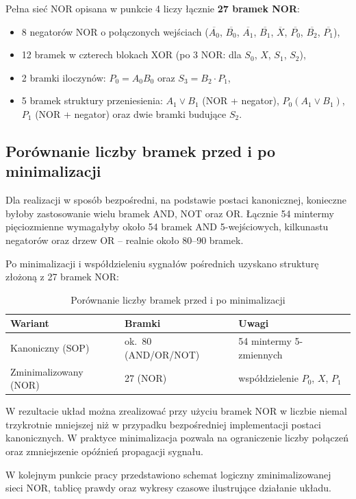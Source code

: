 \documentclass[11pt]{article}
\begin{document}
Pełna sieć NOR opisana w punkcie 4 liczy łącznie \textbf{27 bramek NOR}:
\begin{itemize}
    \item 8 negatorów NOR o połączonych wejściach (\(\overline{A_0}\), \(\overline{B_0}\), \(\overline{A_1}\), \(\overline{B_1}\), \(\overline{X}\), \(\overline{P_0}\), \(\overline{B_2}\), \(\overline{P_1}\)),
    \item 12 bramek w czterech blokach XOR (po 3 NOR: dla \(S_0\), \(X\), \(S_1\), \(S_2\)),
    \item 2 bramki iloczynów: \(P_0 = A_0 B_0\) oraz \(S_3 = B_2 \cdot P_1\),
    \item 5 bramek struktury przeniesienia: \(A_1 \lor B_1\) (NOR + negator), \(P_0(A_1 \lor B_1)\), \(P_1\) (NOR + negator) oraz dwie bramki budujące \(S_2\).
\end{itemize}

\subsection{Porównanie liczby bramek przed i po minimalizacji}

Dla realizacji w sposób bezpośredni, na podstawie postaci kanonicznej, konieczne byłoby zastosowanie wielu bramek AND, NOT oraz OR. Łącznie 54 mintermy pięciozmienne wymagałyby około 54 bramek AND 5-wejściowych, kilkunastu negatorów oraz drzew OR -- realnie około 80--90 bramek.

Po minimalizacji i współdzieleniu sygnałów pośrednich uzyskano strukturę złożoną z 27 bramek NOR:
\begin{table}[H]
\centering
\caption{Porównanie liczby bramek przed i po minimalizacji}
\setlength{\tabcolsep}{5pt}
\begin{tabular}{lll}
\toprule
Wariant & Bramki & Uwagi \\
\midrule
Kanoniczny (SOP) & ok.~80 (AND/OR/NOT) & 54 mintermy 5-zmiennych \\
Zminimalizowany (NOR) & 27 (NOR) & wspó\l{}dzielenie \(P_0\), \(X\), \(P_1\) \\
\bottomrule
\end{tabular}
\end{table}

W rezultacie układ można zrealizować przy użyciu bramek NOR w liczbie niemal trzykrotnie mniejszej niż w przypadku bezpośredniej implementacji postaci kanonicznych. W praktyce minimalizacja pozwala na ograniczenie liczby połączeń oraz zmniejszenie opóźnień propagacji sygnału.

W kolejnym punkcie pracy przedstawiono schemat logiczny zminimalizowanej sieci NOR, tablicę prawdy oraz wykresy czasowe ilustrujące działanie układu.
\end{document}
